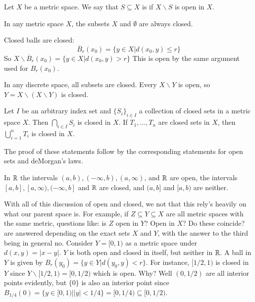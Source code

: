 \begin{defn}
    Let $X$ be a metric space. We say that $S \subseteq X$ is  if $X\backslash S$ is open in $X$.
\end{defn}

\begin{eg}
    In any metric space $X$, the subsets $X$ and $\emptyset$ are always closed.
\end{eg}

\begin{eg}
    Closed balls are closed: \begin{equation*}
        \overline{B}_r(x_0) = \{y \in X\vert d(x_0,y) \leq r\}
    \end{equation*}
    So $X \backslash \overline{B}_r(x_0) = \{y \in X\vert d(x_0,y) > r\}$ This is open by the same argument used for $B_r(x_0)$.
\end{eg}

\begin{eg}
    In any discrete space, all subsets are closed. Every $X \backslash Y$ is open, so $Y = X\backslash(X\backslash Y)$ is closed.
\end{eg}


\begin{prop}
    Let $I$ be an arbitrary index set and $\{S_i\}_{i \in I}$ a collection of closed sets in a metric space $X$. Then $\bigcap_{i \in I}S_i$ is closed in $X$. If $T_1,...,T_n$ are closed sets in $X$, then $\bigcup_{i=1}^nT_i$ is closed in $X$.
\end{prop}
The proof of these statements follow by the corresponding statements for open sets and deMorgan's laws.

\begin{eg}
    In $\mathbb R$ the intervals $(a,b), (-\infty,b),(a,\infty)$, and $\mathbb R$ are open, the intervals $[a,b],[a,\infty),(-\infty,b]$ and $\mathbb R$ are closed, and $(a,b]$ and $[a,b)$ are neither.
\end{eg}

With all of this discussion of open and closed, we not that this rely's heavily on what our parent space is. For example, if $Z \subseteq Y \subseteq X$ are all metric spaces with the same metric, questions like: is $Z$ open in $Y$? Open in $X$? Do these coincide? are answered depending on the exact sets $X$ and $Y$, with the answer to the third being in general no. Consider $Y = [0,1)$ as a metric space under $d(x,y) = |x-y|$. $Y$ is both open and closed in itself, but neither in $\mathbb R$. A ball in $Y$ is given by $B_r(y_0) = \{y \in Y\vert d(y_0,y) < r\}$. For instance, $[1/2,1)$ is closed in $Y$ since $Y\backslash[1/2,1) = [0,1/2)$ which is open. Why? Well $(0,1/2)$ are all interior points evidently, but $\{0\}$ is also an interior point since $B_{1/4}(0) = \{y \in [0,1)\vert |y| < 1/4\} = [0,1/4) \subseteq [0,1/2)$.

